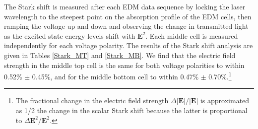 \documentclass [10pt, twoside] {uwthesis}[2012/04/02]
\begin{document}
The Stark shift is measured after each EDM data sequence by locking the laser wavelength to the steepest point on the absorption profile of the EDM cells, then ramping the voltage up and down and observing the change in transmitted light as the excited state energy levels shift with $\mathbf{E}^2$. Each middle cell is measured independently for each voltage polarity. The results of the Stark shift analysis are given in Tables \ref{Stark_MT} and \ref{Stark_MB}. We find that the electric field strength in the middle top cell is the same for both voltage polarities to within 0.52\% $\pm$ 0.45\%, and for the middle bottom cell to within 0.47\% $\pm$ 0.70\%.\footnote{The fractional change in the electric field strength $\Delta|\mathbf{E}|/|\mathbf{E}|$ is approximated as 1/2 the change in the scalar Stark shift because the latter is proportional to $\Delta\mathbf{E}^2/\mathbf{E}^2$. } 
\end{document}
